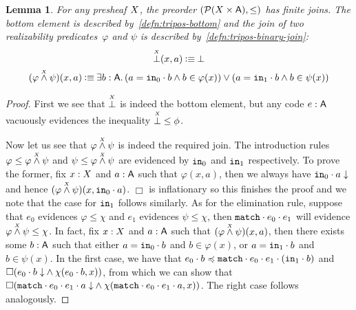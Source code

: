 \documentclass[11pt]{article}
\newtheorem{lemm}[thrm]{Lemma}
\begin{document}
\begin{lemm}\label{lemm:tripos-finite-joins}
  For any presheaf \(X\), the preorder \((\mathcal{P}{({X}\times{\ensuremath{\mathsf{A}}})}, \leq)\) has finite
  joins.
  The bottom element is described by~\ref{defn:tripos-bottom} and the join of two
  realizability predicates~\(\varphi\) and \(\psi\) is described
  by~\ref{defn:tripos-binary-join}:
  \begin{gather}
    \TBot{\X}(x,a)
    \IsDefined
    \IBot
    \label{defn:tripos-bottom}
    \\
    (\TOr{\varphi}{\psi}{\X})(x,a)
    \IsDefined
    \IExists{b:\A}{\IOr%
      {(\IAnd{\IEq{a}{\IAp{\ILeftCode}{b}}}{b\in\varphi(x)})}%
      {(\IAnd{\IEq{a}{\IAp{\IRightCode}{b}}}{b\in\psi(x)})}
    }
    \label{defn:tripos-binary-join}
  \end{gather}
\end{lemm}
\begin{proof}
  First we see that \(\overset{\scriptscriptstyle X}{\bot}\) is indeed the bottom element, but any code
  \(e : \mathsf{A}\) vacuously evidences the inequality \(\overset{\scriptscriptstyle X}{\bot} \leq \phi\).

  Now let us see that \({\varphi}\overset{\scriptscriptstyle X}{\wedge}{\psi}\) is indeed the required join.
  The introduction rules \(\varphi\leq{\varphi}\overset{\scriptscriptstyle X}{\wedge}{\psi}\) and
  \(\psi\leq{\varphi}\overset{\scriptscriptstyle X}{\wedge}{\psi}\) are evidenced by \(\texttt{in}_0\) and
  \(\texttt{in}_1\) respectively.
  To prove the former, fix \(x:X\) and \(a:\mathsf{A}\) such that \(\varphi(x,a)\),
  then we always have \({{\texttt{in}_0}\cdot{a}}\downarrow\) and hence
  \(({\varphi}\overset{\scriptscriptstyle X}{\wedge}{\psi})(x,{\texttt{in}_0}\cdot{a})\).
  \(\Box\) is inflationary so this finishes the proof and we note that the case
  for \(\texttt{in}_1\) follows similarly.
  As for the elimination rule, suppose that \(e_{0}\) evidences
  \(\varphi \leq \chi\) and \(e_{1}\) evidences \(\psi \leq \chi\), then
  \({{\texttt{match}}\cdot{e_{0}}}\cdot{e_{1}}\) will evidence
  \({\varphi}\overset{\scriptscriptstyle X}{\wedge}{\psi} \leq \chi\).
  In fact, fix \(x:X\) and \(a:\mathsf{A}\) such that
  \(({\varphi}\overset{\scriptscriptstyle X}{\wedge}{\psi})(x,a)\), then there exists some \(b:\mathsf{A}\) such that
  either \({a}={{\texttt{in}_0}\cdot{b}}\) and \(b\in\varphi(x)\), or
  \({a}={{\texttt{in}_1}\cdot{b}}\) and \(b\in\psi(x)\).
  In the first case, we have that
  \(\IPLeq%
  {\IAp{e_{0}}{b}}%
  {\IAp{\IAp{\IAp{\IMatchCode}{e_{0}}}{e_{1}}}{(\IAp{\IRightCode}{b})}}%
  \)
  and \(\Box{({{{e_{0}}\cdot{b}}\downarrow}\land{\chi({e_{0}}\cdot{b},x)})}\),
  from which we can show that
  \(\IBox{(\IAnd%
    {\ITotal{\IAp{\IAp{\IAp{\IMatchCode}{e_{0}}}{e_{1}}}{a}}}%
    {\chi(\IAp{\IAp{\IAp{\IMatchCode}{e_{0}}}{e_{1}}}{a},x)}%
  )}\).
  The right case follows analogously.
\end{proof}
\end{document}
